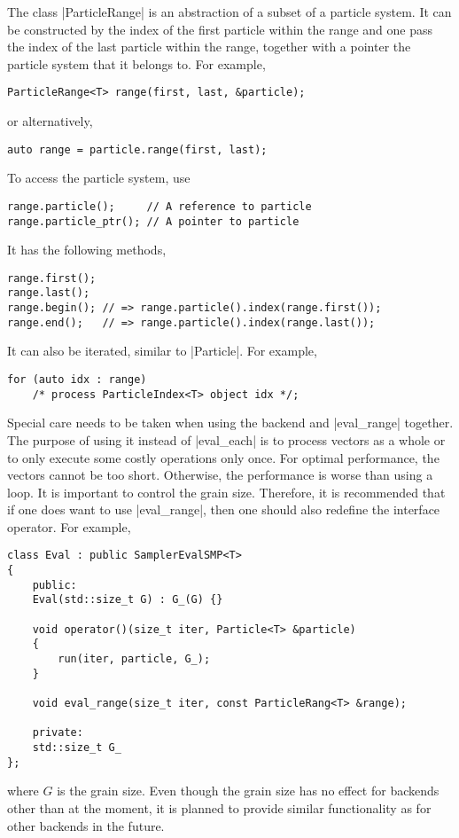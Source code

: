 The class |ParticleRange| is an abstraction of a subset of a particle system.
It can be constructed by the index of the first particle within the range and
one pass the index of the last particle within the range, together with a
pointer the particle system that it belongs to. For example,
\begin{verbatim}
ParticleRange<T> range(first, last, &particle);
\end{verbatim}
or alternatively,
\begin{verbatim}
auto range = particle.range(first, last);
\end{verbatim}
To access the particle system, use
\begin{verbatim}
range.particle();     // A reference to particle
range.particle_ptr(); // A pointer to particle
\end{verbatim}
It has the following methods,
\begin{verbatim}
range.first();
range.last();
range.begin(); // => range.particle().index(range.first());
range.end();   // => range.particle().index(range.last());
\end{verbatim}
It can also be iterated, similar to |Particle|. For example,
\begin{verbatim}
for (auto idx : range)
    /* process ParticleIndex<T> object idx */;
\end{verbatim}

Special care needs to be taken when using the \tbb backend and |eval_range|
together. The purpose of using it instead of |eval_each| is to process vectors
as a whole or to only execute some costly operations only once. For optimal
performance, the vectors cannot be too short. Otherwise, the performance is
worse than using a loop. It is important to control the grain size. Therefore,
it is recommended that if one does want to use |eval_range|, then one should
also redefine the interface operator. For example,
\begin{verbatim}
class Eval : public SamplerEvalSMP<T>
{
    public:
    Eval(std::size_t G) : G_(G) {}

    void operator()(size_t iter, Particle<T> &particle)
    {
        run(iter, particle, G_);
    }

    void eval_range(size_t iter, const ParticleRang<T> &range);

    private:
    std::size_t G_
};
\end{verbatim}
where $G$ is the grain size. Even though the grain size has no effect for
backends other than \tbb at the moment, it is planned to provide similar
functionality as \tbb for other backends in the future.

